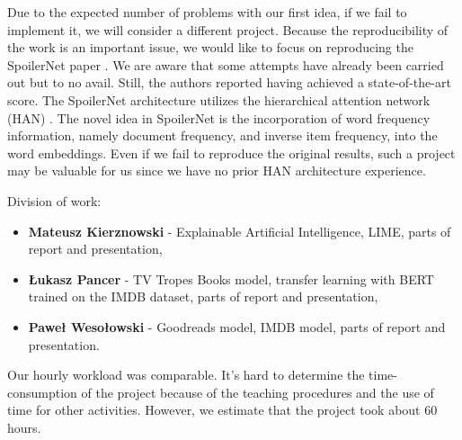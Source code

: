 \documentclass[11pt]{article}
\begin{document}
Due to the expected number of problems with our first idea, if we fail to implement it, we will consider a different project. Because the reproducibility of the work is an important issue, we would like to focus on reproducing the SpoilerNet paper \cite{wan2019fine}. We are aware that some attempts have already been carried out but to no avail. Still, the authors reported having achieved a state-of-the-art score. The SpoilerNet architecture utilizes the hierarchical attention network (HAN) \cite{yang2016hierarchical}. The novel idea in SpoilerNet is the incorporation of word frequency information, namely document frequency, and inverse item frequency, into the word embeddings. Even if we fail to reproduce the original results, such a project may be valuable for us since we have no prior HAN architecture experience. 


Division of work:
\begin{itemize}
    \item \textbf{Mateusz Kierznowski} - Explainable Artificial Intelligence, LIME, parts of report and presentation,
    \item \textbf{Łukasz Pancer} - TV Tropes Books model, transfer learning with BERT trained on the IMDB dataset, parts of report and presentation,
    \item \textbf{Paweł Wesołowski} - Goodreads model, IMDB model, parts of report and presentation.
\end{itemize}
Our hourly workload was comparable. It's hard to determine the time-consumption of the project because of the teaching procedures and the use of time for other activities. However, we estimate that the project took about 60 hours.




\end{document}
